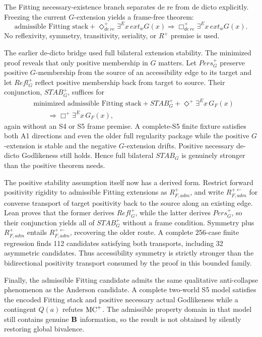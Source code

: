 The Fitting necessary-existence branch separates de re from de dicto explicitly. Freezing the current \(G\)-extension yields a frame-free theorem:
\[
  \text{admissible Fitting stack}
  +\Diamond_{de\,re}^+\exists^E x\,ext_wG(x)
  \Longrightarrow
  \Box_{de\,re}^+\exists^E x\,ext_wG(x).
\]
No reflexivity, symmetry, transitivity, seriality, or \(R^+\) premise is used.

The earlier de-dicto bridge used full bilateral extension stability. The minimized proof reveals that only positive membership in \(G\) matters. Let \(Pers_G^+\) preserve positive \(G\)-membership from the source of an accessibility edge to its target and let \(Refl_G^+\) reflect positive membership back from target to source. Their conjunction, \(STAB_G^+\), suffices for
\[
\begin{split}
  &\text{minimized admissible Fitting stack}
  +STAB_G^+
  +\Diamond^+\exists^E x\,G_F(x)\\
  &\qquad\Longrightarrow
  \Box^+\exists^E x\,G_F(x),
\end{split}
\]
again without an S4 or S5 frame premise. A complete-S5 finite fixture satisfies both A1 directions and even the older full regularity package while the positive \(G\)-extension is stable and the negative \(G\)-extension drifts. Positive necessary de-dicto Godlikeness still holds. Hence full bilateral \(STAB_G\) is genuinely stronger than the positive theorem needs.

The positive stability assumption itself now has a derived form. Restrict forward positivity rigidity to admissible Fitting extensions as \(R_{F,adm}^+\), and write \(R_{F,adm}^{+\leftarrow}\) for converse transport of target positivity back to the source along an existing edge. Lean proves that the former derives \(Refl_G^+\), while the latter derives \(Pers_G^+\), so their conjunction yields all of \(STAB_G^+\) without a frame condition. Symmetry plus \(R_{F,adm}^+\) entails \(R_{F,adm}^{+\leftarrow}\), recovering the older route. A complete 256-case finite regression finds 112 candidates satisfying both transports, including 32 asymmetric candidates. Thus accessibility symmetry is strictly stronger than the bidirectional positivity transport consumed by the proof in this bounded family.

Finally, the admissible Fitting candidate admits the same qualitative anti-collapse phenomenon as the Anderson candidate. A complete two-world S5 model satisfies the encoded Fitting stack and positive necessary actual Godlikeness while a contingent \(Q(a)\) refutes \(\mathrm{MC}^{+}\). The admissible property domain in that model still contains genuine \(\mathbf{B}\) information, so the result is not obtained by silently restoring global bivalence.

